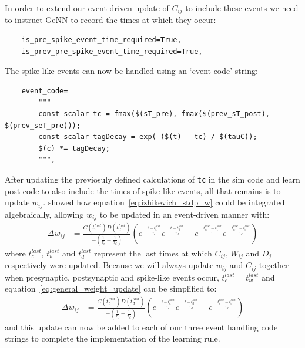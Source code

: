 \documentclass[utf8]{frontiersSCNS} %
\begin{document}
%
In order to extend our event-driven update of $C_{ij}$ to include these events we need to instruct GeNN to record the times at which they occur:
%
\begin{lstlisting}
    is_pre_spike_event_time_required=True,
    is_prev_pre_spike_event_time_required=True,
\end{lstlisting}
%
The spike-like events can now be handled using an `event code' string:
%
\begin{lstlisting}
    event_code=
        """
        const scalar tc = fmax($(sT_pre), fmax($(prev_sT_post), $(prev_seT_pre)));
        const scalar tagDecay = exp(-($(t) - tc) / $(tauC));
        $(c) *= tagDecay;
        """,
\end{lstlisting}
%
After updating the previosuly defined calculations of \lstinline{tc} in the sim code and learn post code to also include the times of spike-like events, all that remains is to update $w_{ij}$.
\citet{Mikaitis2018} showed how equation~\ref{eq:izhikevich_stdp_w} could be integrated algebraically, allowing $w_{ij}$ to be updated in an event-driven manner with:
%
\begin{align}
    \Delta w_{ij} & = \frac{C(t_{c}^{last}) D(t_{d}^{last})}{-\left(\frac{1}{\tau_c} + \frac{1}{\tau_d}\right)} \left(e ^{-\frac{t - t_{c}^{last}}{\tau_c}} e ^{-\frac{t - t_{d}^{last}}{\tau_d}} - e ^{-\frac{t_{w}^{last} - t_{c}^{last}}{\tau_c}} e ^{-\frac{t_{w}^{last} - t_{d}^{last}}{\tau_d}}\right) \label{eq:general_weight_update}
\end{align}
%
where $t_{c}^{last}$, $t_{w}^{last}$ and $t_{d}^{last}$ represent the last times at which $C_{ij}$, $W_{ij}$ and $D_{j}$ respectively were updated.
Because we will always update $w_{ij}$ and $C_{ij}$ together when presynaptic, postsynaptic and spike-like events occur, $t_{c}^{last} = t_{w}^{last}$ and equation~\ref{eq:general_weight_update} can be simplified to:
%
\begin{align}
    \Delta w_{ij} & = \frac{C(t_{c}^{last}) D(t_{d}^{last})}{-\left(\frac{1}{\tau_c} + \frac{1}{\tau_d}\right)} \left(e ^{-\frac{t - t_{c}^{last}}{\tau_c}} e ^{-\frac{t - t_{d}^{last}}{\tau_d}} - e ^{-\frac{t_{c}^{last} - t_{d}^{last}}{\tau_d}}\right) \label{eq:general_weight_update}
\end{align}
%
and this update can now  be added to each of our three event handling code strings to complete the implementation of the learning rule.
\end{document}
